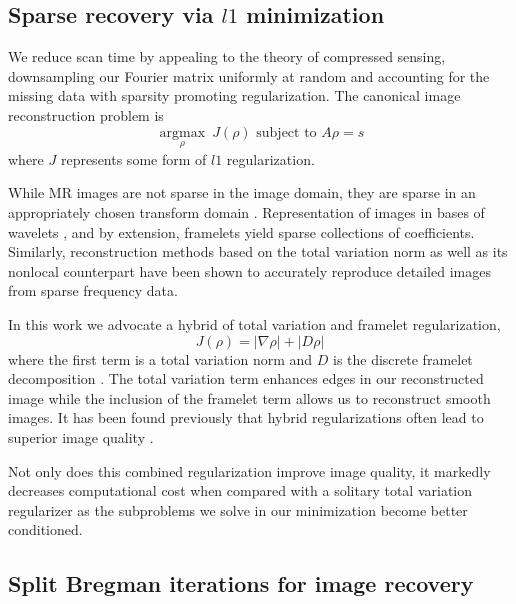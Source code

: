 \documentclass[12pt]{amsart}
\theoremstyle{remark}
\begin{document}
\subsection{Sparse recovery via $l1$ minimization}

We reduce scan time by appealing to the theory of compressed sensing, downsampling our Fourier matrix uniformly at random and accounting for the missing data with sparsity promoting regularization. The canonical image reconstruction problem is
\begin{equation}\label{csequ}
\underset{\rho}{\operatorname{argmax}} \: J(\rho)  \text{ subject to } A \rho = s
\end{equation}
where $J$ represents some form of $l1$ regularization.

While MR images are not sparse in the image domain, they are sparse in an appropriately chosen transform domain \cite{Lustig2007}. Representation of images in bases of wavelets \cite{Duarte}, and by extension, framelets \cite{Daubechies2001} yield sparse collections of coefficients. Similarly, reconstruction methods based on the total variation norm \cite{Rudin1992} as well as its nonlocal counterpart \cite{Liang2009} have been shown to accurately reproduce detailed images from sparse frequency data.

In this work we advocate a hybrid of total variation and framelet regularization,
\begin{equation}
J(\rho) = | \nabla \rho| + | D \rho |
\end{equation}
where the first term is a total variation norm and $D$ is the discrete framelet decomposition \cite{Cai2008}. The total variation term enhances edges in our reconstructed image while the inclusion of the framelet term allows us to reconstruct smooth images. It has been found previously that hybrid regularizations often lead to superior image quality \cite{Goldstein2009a}.

Not only does this combined regularization improve image quality, it markedly decreases computational cost when compared with a solitary total variation regularizer as the subproblems we solve in our minimization become better conditioned.


\subsection{Split Bregman iterations for image recovery}
\end{document}
